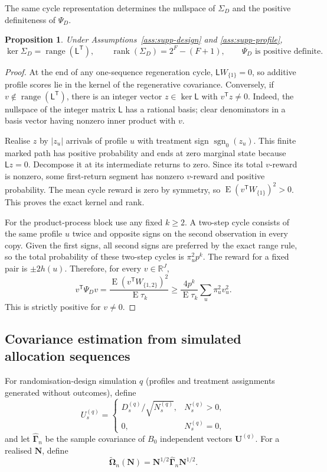 \documentclass[12pt,a4paper]{article}
\newtheorem{proposition}{Proposition}
\theoremstyle{definition}
\theoremstyle{remark}\newtheorem{remark}{Remark}
\numberwithin{equation}{section}
\newcommand{\E}{\operatorname{E}}
\newcommand{\sg}{\operatorname{sgn}_0}
\newcommand{\R}{\mathbb R}
\newcommand{\trans}{^{\mathsf T}}
\begin{document}
The same cycle representation determines the nullspace of $\Sigma_D$ and the positive definiteness of $\Psi_D$.
\begin{proposition}\label{prop:rank}
Under Assumptions~\ref{ass:supp-design} and \ref{ass:supp-profile},
\[
 \ker\Sigma_D=\operatorname{range}(\mathsf L\trans),\qquad
 \operatorname{rank}(\Sigma_D)=2^F-(F+1),\qquad \Psi_D\text{ is positive definite}.
\]
\end{proposition}
\begin{proof}
At the end of any one-sequence regeneration cycle, $\mathsf L W_{\{1\}}=0$, so additive profile scores lie in the kernel of the regenerative covariance. Conversely, if $v\notin\operatorname{range}(\mathsf L\trans)$, there is an integer vector $z\in\ker \mathsf L$ with $v\trans z\ne0$. Indeed, the nullspace of the integer matrix $\mathsf L$ has a rational basis; clear denominators in a basis vector having nonzero inner product with $v$.

Realise $z$ by $|z_u|$ arrivals of profile $u$ with treatment sign $\sg(z_u)$. This finite marked path has positive probability and ends at zero marginal state because $\mathsf L z=0$. Decompose it at its intermediate returns to zero. Since its total $v$-reward is nonzero, some first-return segment has nonzero $v$-reward and positive probability. The mean cycle reward is zero by symmetry, so $\E(v\trans W_{\{1\}})^2>0$. This proves the exact kernel and rank.

For the product-process block use any fixed $k\ge2$. A two-step cycle consists of the same profile $u$ twice and opposite signs on the second observation in every copy. Given the first signs, all second signs are preferred by the exact range rule, so the total probability of these two-step cycles is $\pi_u^2p^k$. The reward for a fixed pair is $\pm2h(u)$. Therefore, for every $v\in\R^J$,
\[
 v\trans\Psi_Dv=\frac{\E(v\trans W_{\{1,2\}})^2}{\E\tau_k}
 \ge\frac{4p^k}{\E\tau_k}\sum_u\pi_u^2v_u^2.
\]
This is strictly positive for $v\ne0$.
\end{proof}


\subsection{Covariance estimation from simulated allocation sequences}
For randomisation-design simulation $q$ (profiles and treatment assignments generated without outcomes), define
\[
U_s^{(q)}=
\begin{cases}
D_s^{(q)}/\sqrt{N_s^{(q)}},&N_s^{(q)}>0,\\
0,&N_s^{(q)}=0,
\end{cases}
\]
and let $\widehat{\bm\Gamma}_n$ be the sample covariance of $B_0$ independent vectors $\bm U^{(q)}$. For a realised $\bm N$, define
\begin{equation}\label{eq:supp-Omega}
\widetilde{\bm\Omega}_n(\bm N)
=\bm N^{1/2}\widehat{\bm\Gamma}_n\bm N^{1/2}.
\end{equation}
\end{document}
